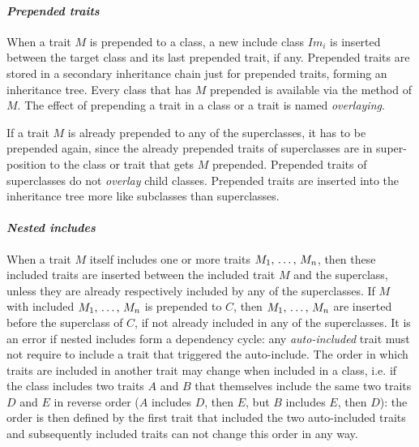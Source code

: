 \paragraph{\em Prepended traits}
When a trait $M$ is prepended to a class, a new include class $Im_i$ is inserted between the target class and its last prepended trait, if any. Prepended traits are stored in a secondary inheritance chain just for prepended traits, forming an inheritance tree. Every class that has $M$ prepended is available via the  method of $M$. The effect of prepending a trait in a class or a trait is named {\em overlaying}. 

If a trait $M$ is already prepended to any of the superclasses, it has to be prepended again, since the already prepended traits of superclasses are in super-position to the class or trait that gets $M$ prepended. Prepended traits of superclasses do not {\em overlay} child classes. Prepended traits are inserted into the inheritance tree more like subclasses than superclasses. 

\paragraph{\em Nested includes}
When a trait $M$ itself includes one or more traits $M_1 ,\, \ldots ,\, M_n$, then these included traits are inserted between the included trait $M$ and the superclass, unless they are already respectively included by any of the superclasses. If $M$ with included $M_1 ,\, \ldots ,\, M_n$ is prepended to $C$, then $M_1 ,\, \ldots ,\, M_n$ are inserted before the superclass of $C$, if not already included in any of the superclasses. It is an error if nested includes form a dependency cycle: any {\em auto-included} trait must not require to include a trait that triggered the auto-include. The order in which traits are included in another trait may change when included in a class, i.e. if the class includes two traits $A$ and $B$ that themselves include the same two traits $D$ and $E$ in reverse order ($A$ includes $D$, then $E$, but $B$ includes $E$, then $D$): the order is then defined by the first trait that included the two auto-included traits and subsequently included traits can not change this order in any way. 

